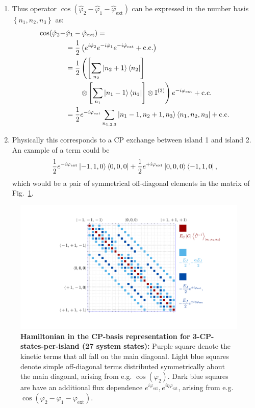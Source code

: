 \documentclass[%
superscriptaddress,
preprint,
preprintnumbers,
bibnotes,
amsmath,
amssymb,
aps,
showkeys,
prb,
]{revtex4-2}
\newcommand{\iketbra}[2]{\ket{#1}\bra{#2}}
\begin{document}
\begin{enumerate}
\item Thus  operator $\cos(\hat{\varphi}_2-\hat{\varphi}_1-\hat{\varphi}_{\text{ext}})$ can be  expressed in the
  number basis $ \left\{n_{1},n_2,n_3\right\} $ as: {\scriptsize
    \begin{equation}
      \label{eq:ab4}
      \begin{aligned}
	\cos(\hat{\varphi}_2-& \hat{\varphi}_1-\hat{\varphi}_{\text{ext}}) =\\
        & = \frac{1}{2}\left(e^{i\hat{\varphi}_{2}}e^{-i\hat{\varphi}_1}e^{-i\hat{\varphi}_{\text{ext}}}+\text{c.c.}\right)\\
        & =  \frac{1}{2} \left(\left[\sum_{n_2}\iketbra{n_2+1}{n_2}\right]\right. \\
        & \qquad \left.\otimes \left[\sum_{n_1}\iketbra{n_1-1}{n_1}\right]
          \otimes\mathbb{I}^{(3)}\right)e^{-i\varphi_{\text{ext}}} + \text{c.c.}\\
        &             =              \frac{1}{2}e^{-i\varphi_{\text{ext}}}             \sum_{n_{1,2,3}}
        \iketbra{n_1-1,n_2+1,n_3}{n_1,n_2,n_3} + \text{c.c.}
      \end{aligned}
    \end{equation}}
  
\item Physically this corresponds  to a CP exchange between island 1 and  island 2. An example
  of a term could be
  \begin{equation}
    \label{eq:ab6}
    \frac{1}{2}e^{-i\varphi_{\text{ext}}}\iketbra{-1,1,0}{0,0,0} + \frac{1}{2}e^{+i\varphi_{\text{ext}}}\iketbra{0,0,0}{-1,1,0},
  \end{equation}
  \noindent  which would  be a  pair of  symmetrical off-diagonal  elements in  the matrix  of
  Fig.~\ref{fig:matrix_representation}.
\end{enumerate}

\begin{figure}[h]
  \includegraphics[width=120mm]{fig4}
  \caption{\small \textbf{Hamiltonian in the CP-basis representation for 3-CP-states-per-island (27 system states):} Purple square denote the kinetic terms that all fall on the main diagonal. Light blue squares denote simple off-diagonal terms distributed symmetrically about the main diagonal, arising from e.g. $\cos(\varphi_2)$. Dark blue squares are have an additional flux dependence $e^{i\varphi_{\text{ext}}}, e^{i\eta\varphi_{\text{ext}}}$, arising from e.g. $\cos(\varphi_2-\varphi_1-\varphi_{\text{ext}})$.
    \label{fig:matrix_representation} }
\end{figure}
\end{document}
